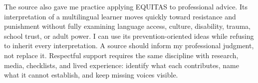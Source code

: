 The source also gave me practice applying EQUITAS to professional advice. Its interpretation of a multilingual learner moves quickly toward resistance and punishment without fully examining language access, culture, disability, trauma, school trust, or adult power. I can use its prevention-oriented ideas while refusing to inherit every interpretation. A source should inform my professional judgment, not replace it. Respectful support requires the same discipline with research, media, checklists, and lived experience: identify what each contributes, name what it cannot establish, and keep missing voices visible.
